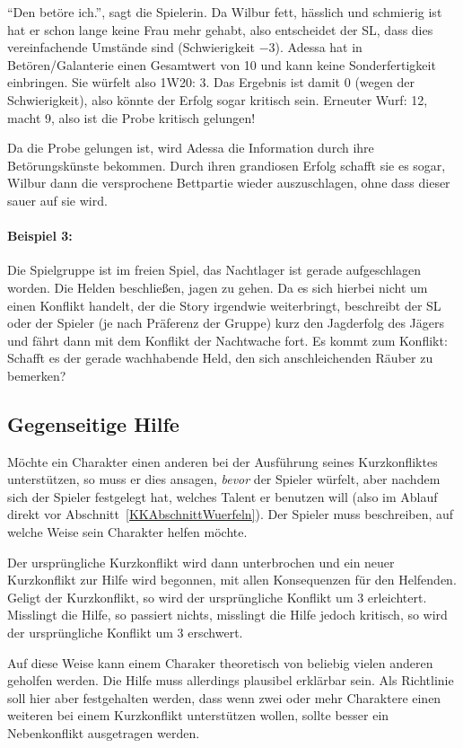 \begin{beispiel}
``Den betöre ich.'', sagt die Spielerin. Da Wilbur fett, hässlich und schmierig ist hat er schon lange keine Frau mehr gehabt, also entscheidet der SL, dass dies vereinfachende Umstände sind (Schwierigkeit $-3$). Adessa hat in Betören/Galanterie einen Gesamtwert von 10 und kann keine Sonderfertigkeit einbringen. Sie würfelt also 1W20: 3. Das Ergebnis ist damit 0 (wegen der Schwierigkeit), also könnte der Erfolg sogar kritisch sein. Erneuter Wurf: 12, macht 9, also ist die Probe kritisch gelungen!

Da die Probe gelungen ist, wird Adessa die Information durch ihre Betörungskünste bekommen. Durch ihren grandiosen Erfolg schafft sie es sogar, Wilbur dann die versprochene Bettpartie wieder auszuschlagen, ohne dass dieser sauer auf sie wird.

\paragraph{Beispiel 3:} Die Spielgruppe ist im freien Spiel, das Nachtlager ist gerade aufgeschlagen worden. Die Helden beschließen, jagen zu gehen. Da es sich hierbei nicht um einen Konflikt handelt, der die Story irgendwie weiterbringt, beschreibt der SL oder der Spieler (je nach Präferenz der Gruppe) kurz den Jagderfolg des Jägers und fährt dann mit dem Konflikt der Nachtwache fort. Es kommt zum Konflikt: Schafft es der gerade wachhabende Held, den sich anschleichenden Räuber zu bemerken?
\end{beispiel}

\subsection{Gegenseitige Hilfe}
Möchte ein Charakter einen anderen bei der Ausführung seines Kurzkonfliktes unterstützen, so muss er dies ansagen, \emph{bevor} der Spieler würfelt, aber nachdem sich der Spieler festgelegt hat, welches Talent er benutzen will (also im Ablauf direkt vor Abschnitt~\ref{KKAbschnittWuerfeln}). Der Spieler muss beschreiben, auf welche Weise sein Charakter helfen möchte.

Der ursprüngliche Kurzkonflikt wird dann unterbrochen und ein neuer Kurzkonflikt zur Hilfe wird begonnen, mit allen Konsequenzen für den Helfenden. Geligt der Kurzkonflikt, so wird der ursprüngliche Konflikt um 3 erleichtert. Misslingt die Hilfe, so passiert nichts, misslingt die Hilfe jedoch kritisch, so wird der ursprüngliche Konflikt um 3 erschwert.

Auf diese Weise kann einem Charaker theoretisch von beliebig vielen anderen geholfen werden. Die Hilfe muss allerdings plausibel erklärbar sein. Als Richtlinie soll hier aber festgehalten werden, dass wenn zwei oder mehr Charaktere einen weiteren bei einem Kurzkonflikt unterstützen wollen, sollte besser ein Nebenkonflikt ausgetragen werden.

